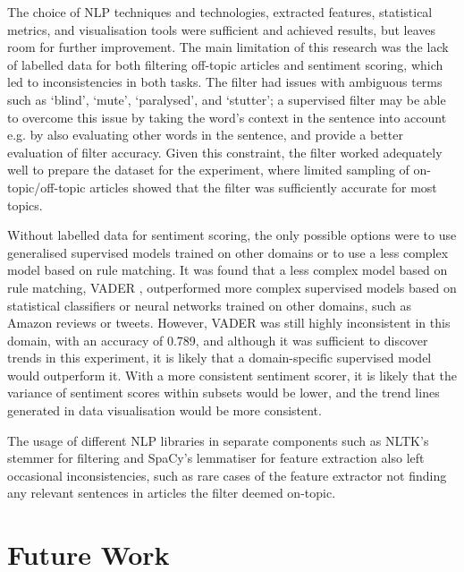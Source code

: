 \documentclass{report}
\begin{document}
The choice of NLP techniques and technologies, extracted features, statistical metrics, and visualisation tools were sufficient and achieved results, but leaves room for further improvement.
The main limitation of this research was the lack of labelled data for both filtering off-topic articles and sentiment scoring, which led to inconsistencies in both tasks.
The filter had issues with ambiguous terms such as `blind', `mute', `paralysed', and `stutter'; 
a supervised filter may be able to overcome this issue by taking the word's context in the sentence into account e.g. by also evaluating other words in the sentence, and provide a better evaluation of filter accuracy. 
Given this constraint, the filter worked adequately well to prepare the dataset for the experiment, where
limited sampling of on-topic/off-topic articles showed that the filter was sufficiently accurate for most topics.

Without labelled data for sentiment scoring, the only possible options were to use generalised supervised models trained on other domains or to use a less complex model based on rule matching.
It was found that a less complex model based on rule matching, VADER \cite{VADER}, outperformed more complex supervised models based on statistical classifiers or neural networks trained on other domains, such as Amazon reviews or tweets.
However, VADER was still highly inconsistent in this domain, with an accuracy of 0.789, and although it was sufficient to discover trends in this experiment, it is likely that a domain-specific supervised model would outperform it.
With a more consistent sentiment scorer, it is likely that the variance of sentiment scores within subsets would be lower, and the trend lines generated in data visualisation would be more consistent.

The usage of different NLP libraries in separate components such as NLTK's stemmer for filtering and SpaCy's lemmatiser for feature extraction also left occasional inconsistencies, such as rare cases of the feature extractor not finding any relevant sentences in articles the filter deemed on-topic.

\section{Future Work} \label{Future Work}
\end{document}

